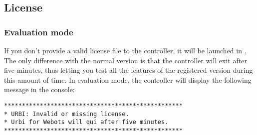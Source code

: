 




\subsection{License}

\subsubsection{Evaluation mode}

If you don't provide a valid license file to the \urbi controller, it
will be launched in . The only difference with
the normal version is that the controller will exit after five
minutes, thus letting you test all the features of the registered
version during this amount of time. In evaluation mode, the \urbi
controller will display the following message in the \webots console:

\begin{lstlisting}
**************************************************
* URBI: Invalid or missing license.
* Urbi for Webots will qui after five minutes.
**************************************************
\end{lstlisting}

